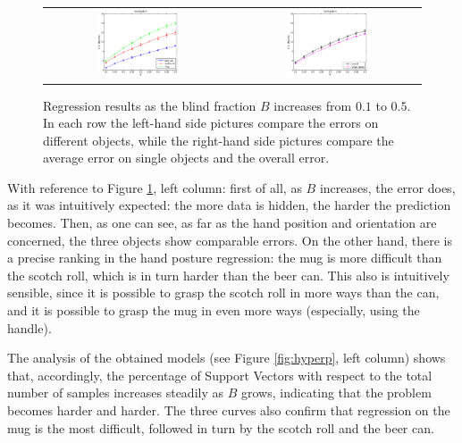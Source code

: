 \begin{figure}[htbp]
\begin{center}
\begin{tabular}{cc}
      \includegraphics[width=0.45\textwidth]{error_pst.eps} &
      \includegraphics[width=0.45\textwidth]{error_cmp_pst.eps} \\
    \end{tabular}
    \caption{Regression results as the blind fraction $B$ increases
    from $0.1$ to $0.5$. In each row the
    left-hand side pictures compare the errors on different objects,
    while the right-hand side pictures compare the average error on
    single objects and the overall error.}
    \label{fig:err_all}
  \end{center}
\end{figure}

With reference to Figure \ref{fig:err_all}, left column: first of all, as $B$
increases, the error does, as it was intuitively expected: the more
data is hidden, the harder the prediction becomes. Then, as one can
see, as far as the hand position and orientation are concerned, the
three objects show comparable errors. On the other hand, there is a
precise ranking in the hand posture regression: the mug is more
difficult than the scotch roll, which is in turn harder than the beer
can. This also is intuitively sensible, since it is possible to grasp
the scotch roll in more ways than the can, and it is possible to grasp
the mug in even more ways (especially, using the handle).

The analysis of the obtained models (see Figure
\ref{fig:hyperp}, left column) shows that, accordingly, the percentage
of Support Vectors with respect to the total number of samples
increases steadily as $B$ grows, indicating that the problem becomes
harder and harder. The three curves also confirm that regression on
the mug is the most difficult, followed in turn by the scotch roll and
the beer can.

